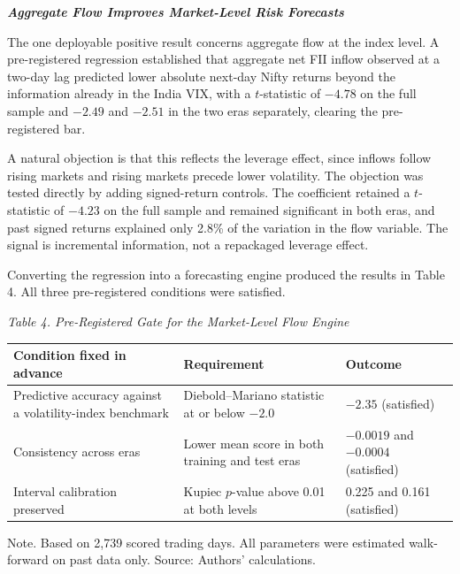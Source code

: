 \documentclass[12pt]{article}
\begin{document}
\textbf{\emph{Aggregate Flow Improves Market-Level Risk Forecasts}}

The one deployable positive result concerns aggregate flow at the index level.
A pre-registered regression established that aggregate net FII inflow observed
at a two-day lag predicted lower absolute next-day Nifty returns beyond the
information already in the India VIX, with a $t$-statistic of $-4.78$ on the
full sample and $-2.49$ and $-2.51$ in the two eras separately, clearing the
pre-registered bar.

A natural objection is that this reflects the leverage effect, since inflows
follow rising markets and rising markets precede lower volatility. The
objection was tested directly by adding signed-return controls. The
coefficient retained a $t$-statistic of $-4.23$ on the full sample and
remained significant in both eras, and past signed returns explained only
2.8\% of the variation in the flow variable. The signal is incremental
information, not a repackaged leverage effect.

Converting the regression into a forecasting engine produced the results in
Table 4. All three pre-registered conditions were satisfied.

\begin{table}[htbp]
\centering
\emph{Table 4. Pre-Registered Gate for the Market-Level Flow Engine}
\vspace{0.3\baselineskip}
\begin{singlespace}
\begin{tabular}{p{2.0in}p{1.7in}p{1.5in}}
\toprule
Condition fixed in advance & Requirement & Outcome \\
\midrule
Predictive accuracy against a volatility-index benchmark &
Diebold--Mariano statistic at or below $-2.0$ &
$-2.35$ (satisfied) \\
Consistency across eras &
Lower mean score in both training and test eras &
$-0.0019$ and $-0.0004$ (satisfied) \\
Interval calibration preserved &
Kupiec $p$-value above 0.01 at both levels &
0.225 and 0.161 (satisfied) \\
\bottomrule
\end{tabular}
\end{singlespace}
\vspace{0.3\baselineskip}
\begin{singlespace}
\RaggedRight
Note. Based on 2,739 scored trading days. All parameters were
estimated walk-forward on past data only. Source: Authors' calculations.
\end{singlespace}
\end{table}
\end{document}
